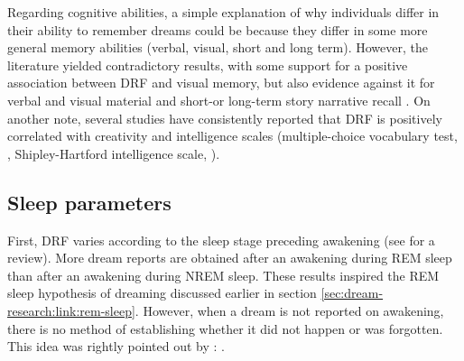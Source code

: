 Regarding cognitive abilities, a simple explanation of why individuals differ in their ability to remember dreams could be because they differ in some more general memory abilities (verbal, visual, short and long term). However, the literature yielded contradictory results, with some support for a positive association between DRF and visual memory, but also evidence against it for verbal and visual material and short-or long-term story narrative recall \citep{ruby_experimental_2011, blagrove_trait_2010}. On another note, several studies have consistently reported that DRF is positively correlated with creativity \citep{fitch_variations_1989, schredl_creativity_1995, schredl_factors_2003} and intelligence scales (multiple-choice vocabulary test, \citealp{schonbar_manifest_1959}, Shipley-Hartford intelligence scale, \citealp{connor_reported_1970}).

\subsection{Sleep parameters}
\label{sec:dream-recall:param:sleep}

First, DRF varies according to the sleep stage preceding awakening (see \citealp{nielsen_review_2000} for a review). More dream reports are obtained after an awakening during REM sleep than after an awakening during NREM sleep. These results inspired the REM sleep hypothesis of dreaming discussed earlier in section \ref{sec:dream-research:link:rem-sleep}. However, when a dream is not reported on awakening, there is no method of establishing whether it did not happen or was forgotten. This idea was rightly pointed out by \citet{conduit_poor_2004}: .

